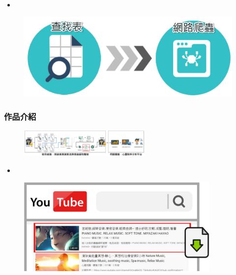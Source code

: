 \documentclass[10pt, conference, compsocconf]{beamer}
\begin{document}
\begin{CJK}{UTF8}{}
\begin{frame}
\begin{itemize}
\item {}
\end{itemize}

\begin{figure}[!t]
\begin{center}
\includegraphics[width=12cm]{./Figures/506.jpg}
\end{center}
\end{figure}
\end{frame}

\begin{frame}
\frametitle{作品介紹}

\vspace{-5mm}
\begin{figure}[t]
\begin{flushright}
\includegraphics[width=6.5cm]{./Figures/framework_version4_7.pdf}
\end{flushright}
\end{figure}

\vspace{-5mm}

\begin{itemize}
\item {}
\end{itemize}

\begin{figure}[!t]
\begin{center}
\includegraphics[width=10cm]{./Figures/507.jpg}
\end{center}
\end{figure}
\end{frame}


\end{CJK}
\end{document}
